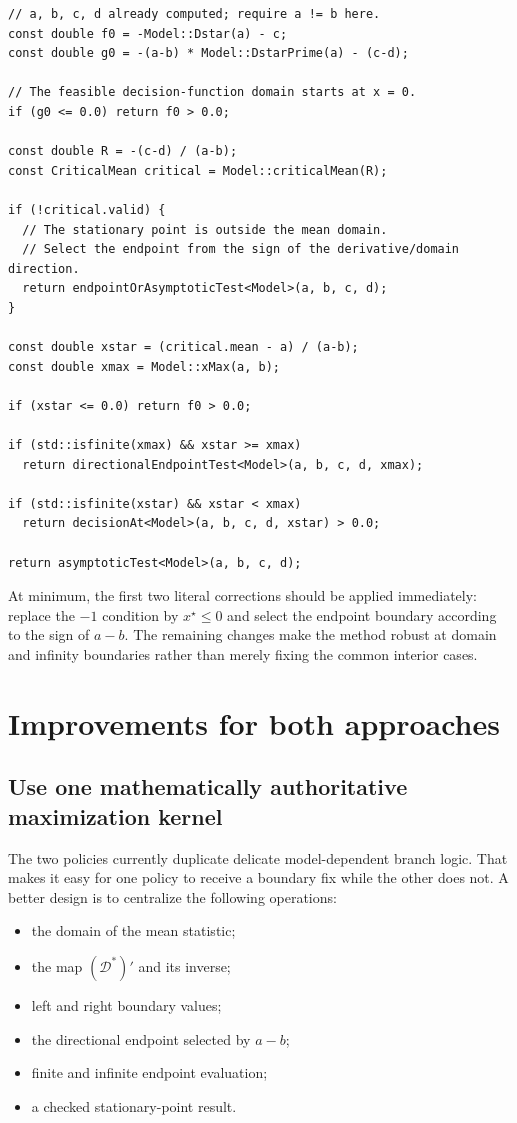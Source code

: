 \documentclass[11pt]{article}
\newcommand{\Dstar}{\mathcal{D}^*}
\begin{document}
\begin{verbatim}
// a, b, c, d already computed; require a != b here.
const double f0 = -Model::Dstar(a) - c;
const double g0 = -(a-b) * Model::DstarPrime(a) - (c-d);

// The feasible decision-function domain starts at x = 0.
if (g0 <= 0.0) return f0 > 0.0;

const double R = -(c-d) / (a-b);
const CriticalMean critical = Model::criticalMean(R);

if (!critical.valid) {
  // The stationary point is outside the mean domain.
  // Select the endpoint from the sign of the derivative/domain direction.
  return endpointOrAsymptoticTest<Model>(a, b, c, d);
}

const double xstar = (critical.mean - a) / (a-b);
const double xmax = Model::xMax(a, b);

if (xstar <= 0.0) return f0 > 0.0;

if (std::isfinite(xmax) && xstar >= xmax)
  return directionalEndpointTest<Model>(a, b, c, d, xmax);

if (std::isfinite(xstar) && xstar < xmax)
  return decisionAt<Model>(a, b, c, d, xstar) > 0.0;

return asymptoticTest<Model>(a, b, c, d);
\end{verbatim}

At minimum, the first two literal corrections should be applied immediately:
replace the $-1$ condition by $x^\star\leq0$ and select the endpoint boundary
according to the sign of $a-b$.  The remaining changes make the method robust
at domain and infinity boundaries rather than merely fixing the common
interior cases.

\section{Improvements for both approaches}

\subsection{Use one mathematically authoritative maximization kernel}

The two policies currently duplicate delicate model-dependent branch logic.
That makes it easy for one policy to receive a boundary fix while the other
does not.  A better design is to centralize the following operations:

\begin{itemize}
  \item the domain of the mean statistic;
  \item the map $(\Dstar)'$ and its inverse;
  \item left and right boundary values;
  \item the directional endpoint selected by $a-b$;
  \item finite and infinite endpoint evaluation;
  \item a checked stationary-point result.
\end{itemize}
\end{document}
